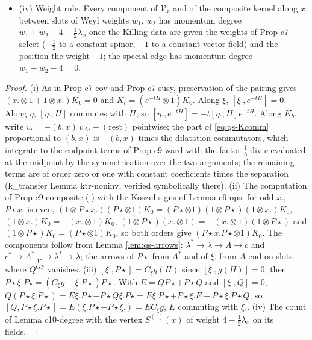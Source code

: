 \begin{corollary}
\begin{itemize}
\item (iv) Weight rule. Every component of $\mathcal V_x$ and of the composite kernel along $x$ between slots of Weyl weights $w_1$, $w_2$ has momentum degree $w_1+w_2-4-\tfrac12\lambda_x$ once the Killing data are given the weights of Prop c7-select ($-\tfrac12$ to a constant spinor, $-1$ to a constant vector field) and the position the weight $-1$; the special edge has momentum degree $w_1+w_2-4=0$.
\end{itemize}
\end{corollary}

\begin{proof}
(i) As in Prop c7-cov and Prop c7-susy, preservation of the pairing gives $(x.\otimes1+1\otimes x.)K_0=0$ and $K_t=(e^{-tH}\otimes1)K_0$. Along $\xi$, $[\xi.,e^{-tH}]=0$. Along $\eta$, $[\eta.,H]$ commutes with $H$, so $[\eta.,e^{-tH}]=-t[\eta.,H]e^{-tH}$. Along $K_b$, write $v.=-(b,x)\,v_\Delta.+(\text{rest})$ pointwise; the part of \eqref{eq:qs-Kcomm} proportional to $(b,x)$ is $-(b,x)$ times the dilatation commutators, which integrate to the endpoint terms of Prop c9-ward with the factor $\tfrac18\operatorname{div}v$ evaluated at the midpoint by the symmetrisation over the two arguments; the remaining terms are of order zero or one with constant coefficients times the separation (k\_transfer Lemma ktr-noninv, verified symbolically there). (ii) The computation of Prop c9-composite (i) with the Koszul signs of Lemma c9-ops: for odd $x.$, $P\star x.$ is even, $(1\otimes P\star x.)(P\star\otimes1)K_0=(P\star\otimes1)(1\otimes P\star)(1\otimes x.)K_0$, $(1\otimes x.)K_0=-(x.\otimes1)K_0$, $(1\otimes P\star)(x.\otimes1)=-(x.\otimes1)(1\otimes P\star)$ and $(1\otimes P\star)K_0=(P\star\otimes1)K_0$, so both orders give $(P\star x.P\star\otimes1)K_0$. The components follow from Lemma \ref{lem:qs-arrows}: $\lambda^*\to\lambda\to A\to c$ and $c^*\to A^*|_V\to\lambda^*\to\lambda$; the arrows of $P\star$ from $A^*$ and of $\xi.$ from $A$ end on slots where $Q^{GF}$ vanishes. (iii) $[\xi.,P\star]=C_\xi g(H)$ since $[\xi.,g(H)]=0$; then $P\star\xi.P\star=(C_\xi g-\xi.P\star)P\star$. With $E=QP\star+P\star Q$ and $[\xi.,Q]=0$, $Q(P\star\xi.P\star)=E\xi.P\star-P\star Q\xi.P\star=E\xi.P\star+P\star\xi.E-P\star\xi.P\star Q$, so $[Q,P\star\xi.P\star]=E(\xi.P\star+P\star\xi.)=EC_\xi g$, $E$ commuting with $\xi.$. (iv) The count of Lemma c10-degree with the vertex $S^{(1)}(x)$ of weight $4-\tfrac12\lambda_x$ on its fields.
\end{proof}

